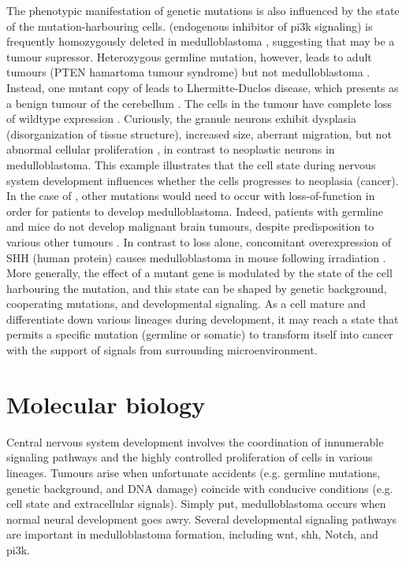The phenotypic manifestation of genetic mutations is also influenced by the state of the mutation-harbouring cells.  (endogenous inhibitor of \gls{pi3k} signaling) is frequently homozygously deleted in medulloblastoma , suggesting that  may be a tumour supressor. Heterozygous germline  mutation, however, leads to adult tumours (PTEN hamartoma tumour syndrome) but not medulloblastoma . Instead, one mutant copy of  leads to Lhermitte-Duclos disease, which presents as a benign tumour of the cerebellum . The cells in the tumour have complete loss of wildtype  expression . Curiously, the granule neurons exhibit dysplasia (disorganization of tissue structure), increased size, aberrant migration, but not abnormal cellular proliferation , in contrast to neoplastic neurons in medulloblastoma. This example illustrates that the cell state during nervous system development influences whether the cells progresses to neoplasia (cancer). In the case of , other mutations would need to occur with  loss-of-function in order for patients to develop medulloblastoma. Indeed, patients with germline  and \high{+/-} mice do not develop malignant brain tumours, despite predisposition to various other tumours . In contrast to  loss alone, concomitant overexpression of SHH (human protein) causes medulloblastoma in mouse following irradiation . More generally, the effect of a mutant gene is modulated by the state of the cell harbouring the mutation, and this state can be shaped by genetic background, cooperating mutations, and developmental signaling. As a cell mature and differentiate down various lineages during development, it may reach a state that permits a specific mutation (germline or somatic) to transform itself into cancer with the support of signals from surrounding microenvironment.


\section{Molecular biology}

Central nervous system development involves the coordination of innumerable signaling pathways and the highly controlled proliferation of cells in various lineages. Tumours arise when unfortunate accidents (e.g. germline mutations, genetic background, and DNA damage) coincide with conducive conditions (e.g. cell state and extracellular signals). Simply put, medulloblastoma occurs when normal neural development goes awry. Several developmental signaling pathways are important in medulloblastoma formation, including \gls{wnt}, \gls{shh}, Notch, and \gls{pi3k}. 

